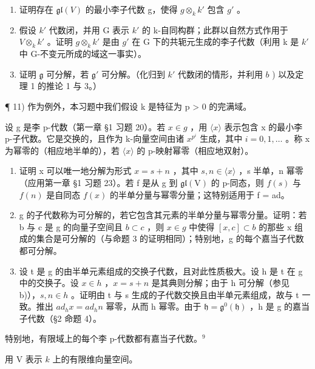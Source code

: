 \begin{enumerate}
\def\labelenumi{\alph{enumi})}
\item
  证明存在 \(\mathfrak{gl}(V)\) 的最小李子代数 g，使得 \(g\otimes_{k}k'\) 包含 \(g'\) 。
\item
  假设 \(k'\) 代数闭，并用 G 表示 \(k'\) 的 k-自同构群；此群以自然方式作用于 \(V \otimes_{k} k'\) 。证明 \(g \otimes_{k} k'\) 是由 \(g'\) 在 G 下的共轭元生成的李子代数（利用 k 是 \(k'\) 中 G-不变元所成的域这一事实）。
\item
  证明 \(\mathfrak{g}\) 可分解，若 \(\mathfrak{g}'\) 可分解。（化归到 \(k'\) 代数闭的情形，并利用 \(b\) ) 以及定理 1 的推论 1 与 3。）
\end{enumerate}

¶ 11) 作为例外，本习题中我们假设 k 是特征为 p \textgreater{} 0 的完满域。

设 g 是李 p-代数（第一章 §1 习题 20）。若 \(x \in g\) ，用 \(\langle x \rangle\) 表示包含 x 的最小李 p-子代数。它是交换的，且作为 k-向量空间由诸 \(x^{p^{i}}\) 生成，其中 \(i = 0, 1, \ldots\) 。称 x 为幂零的（相应地半单的），若 \(\langle x \rangle\) 的 p-映射幂零（相应地双射）。

\begin{enumerate}
\def\labelenumi{\alph{enumi})}
\item
  证明 x 可以唯一地分解为形式 \(x = s + n\) ，其中 \(s, n \in \langle x \rangle\) ，s 半单，n 幂零（应用第一章 §1 习题 23）。若 f 是从 g 到 \(\mathfrak{gl}(\mathrm{V})\) 的 p-同态，则 \(f(s)\) 与 \(f(n)\) 是自同态 \(f(x)\) 的半单分量与幂零分量；这特别适用于 f = ad。
\item
  g 的子代数称为可分解的，若它包含其元素的半单分量与幂零分量。证明：若 b 与 c 是 g 的向量子空间且 \(b \subset c\) ，则 \(x \in g\) 中使得 \([x, c] \subset b\) 的那些 x 组成的集合是可分解的（与命题 3 的证明相同）；特别地，g 的每个嘉当子代数都可分解。
\item
  设 t 是 g 的由半单元素组成的交换子代数，且对此性质极大。设 h 是 t 在 g 中的交换子。设 \(x \in h\) ，\(x = s + n\) 是其典则分解；由于 h 可分解（参见 b)），\(s, n \in h\) 。证明由 t 与 s 生成的子代数交换且由半单元素组成，故与 t 一致。推出 \(ad_{h}x = ad_{h}n\) 幂零，从而 h 幂零。由于 \(\mathfrak{h} = \mathfrak{g}^{0}(\mathfrak{h})\) ，h 是 g 的嘉当子代数（§2 命题 4）。
\end{enumerate}

特别地，有限域上的每个李 p-代数都有嘉当子代数。\(^{9}\)


用 V 表示 \(k\) 上的有限维向量空间。

